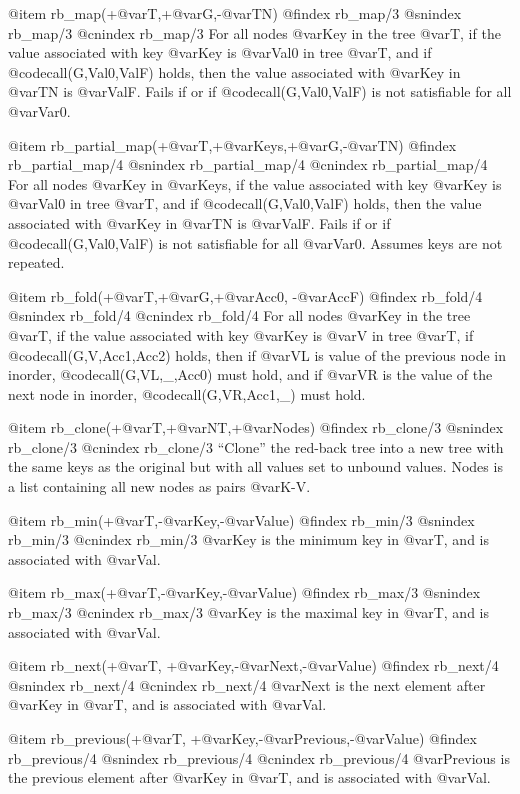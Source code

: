 {{{{{{{{@item rb_map(+@var{T},+@var{G},-@var{TN})
@findex rb_map/3
@snindex rb_map/3
@cnindex rb_map/3
For all nodes @var{Key} in the tree @var{T}, if the value associated with
key @var{Key} is @var{Val0} in tree @var{T}, and if
@code{call(G,Val0,ValF)} holds, then the value associated with @var{Key}
in @var{TN} is @var{ValF}. Fails if or if @code{call(G,Val0,ValF)} is not
satisfiable for all @var{Var0}.

@item rb_partial_map(+@var{T},+@var{Keys},+@var{G},-@var{TN})
@findex rb_partial_map/4
@snindex rb_partial_map/4
@cnindex rb_partial_map/4
For all nodes @var{Key} in @var{Keys}, if the value associated with key
@var{Key} is @var{Val0} in tree @var{T}, and if @code{call(G,Val0,ValF)}
holds, then the value associated with @var{Key} in @var{TN} is
@var{ValF}. Fails if or if @code{call(G,Val0,ValF)} is not satisfiable
for all @var{Var0}. Assumes keys are not repeated.

@item rb_fold(+@var{T},+@var{G},+@var{Acc0}, -@var{AccF})
@findex rb_fold/4
@snindex rb_fold/4
@cnindex rb_fold/4
	For all nodes @var{Key} in the tree @var{T}, if the value
associated with key @var{Key} is @var{V} in tree @var{T}, if
@code{call(G,V,Acc1,Acc2)} holds, then if @var{VL} is value of the
previous node in inorder, @code{call(G,VL,_,Acc0)} must hold, and if
@var{VR} is the value of the next node in inorder,
@code{call(G,VR,Acc1,_)} must hold.

@item rb_clone(+@var{T},+@var{NT},+@var{Nodes})
@findex rb_clone/3
@snindex rb_clone/3
@cnindex rb_clone/3
``Clone'' the red-back tree into a new tree with the same keys as the
original but with all values set to unbound values. Nodes is a list
containing all new nodes as pairs @var{K-V}.

@item rb_min(+@var{T},-@var{Key},-@var{Value})
@findex rb_min/3
@snindex rb_min/3
@cnindex rb_min/3
@var{Key}  is the minimum key in @var{T}, and is associated with @var{Val}.

@item rb_max(+@var{T},-@var{Key},-@var{Value})
@findex rb_max/3
@snindex rb_max/3
@cnindex rb_max/3
@var{Key}  is the maximal key in @var{T}, and is associated with @var{Val}.

@item rb_next(+@var{T}, +@var{Key},-@var{Next},-@var{Value})
@findex rb_next/4
@snindex rb_next/4
@cnindex rb_next/4
@var{Next} is the next element after @var{Key} in @var{T}, and is
associated with @var{Val}.

@item rb_previous(+@var{T}, +@var{Key},-@var{Previous},-@var{Value})
@findex rb_previous/4
@snindex rb_previous/4
@cnindex rb_previous/4
@var{Previous} is the previous element after @var{Key} in @var{T}, and is
associated with @var{Val}.

}}}}}}}}

